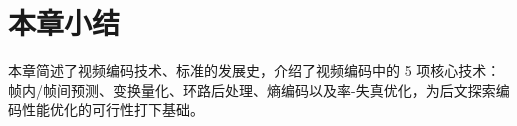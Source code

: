 \section{本章小结}
本章简述了视频编码技术、标准的发展史，介绍了视频编码中的 5 项核心技术：帧内/帧间预测、变换量化、环路后处理、熵编码以及率-失真优化，为后文探索编码性能优化的可行性打下基础。